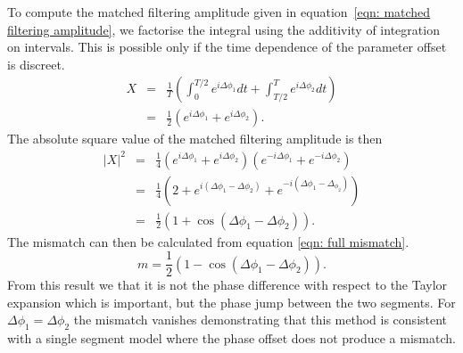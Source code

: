 To compute the matched filtering amplitude given in equation~\eqref{eqn: matched
filtering amplitude}, we factorise the integral using the additivity of
integration on intervals. This is possible only if the time dependence of the
parameter offset is discreet. 
\begin{eqnarray}
X & = &\frac{1}{T }\left(\int_{0}^{T /2}e^{i\Delta\phi_{1}} dt  + 
\int_{T/2}^{T} e^{i\Delta\phi_{2}}dt\right)\\
& = & \frac{1}{2}\left(e^{i\Delta\phi_{1}} + e^{i\Delta\phi_{2}}\right).
\end{eqnarray}
The absolute square value of the matched filtering amplitude is then
\begin{eqnarray}
|X|^{2}& = &\frac{1}{4}\left(e^{i\Delta\phi_{1}} + e^{i\Delta\phi_{2}}\right) \left(e^{-i\Delta\phi_{1}} + e^{-i\Delta\phi_{2}}\right)\\
& = &\frac{1}{4} \left(2 + e^{i(\Delta\phi_{1} - \Delta \phi_{2})} +  e^{-i(\Delta\phi_{1} - \Delta_{\phi_{2}})} \right) \\
& = &\frac{1}{2}\left(1 + \cos(\Delta\phi_{1} - \Delta\phi_{2})\right).
\end{eqnarray}
The mismatch can then be calculated from equation \eqref{eqn: full mismatch}.
\begin{equation}
m = \frac{1}{2}\left(1 - \cos(\Delta\phi_{1} - \Delta\phi_{2})\right).
\label{eqn: two segment phase mismatch}
\end{equation}
From this result we that it is not the phase difference with respect to the
Taylor expansion which is important, but the phase jump between the two
segments. For $\Delta \phi_{1} = \Delta \phi_{2}$ the mismatch vanishes
demonstrating that this method is consistent with a single segment model where
the phase offset does not produce a mismatch.


